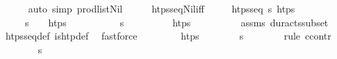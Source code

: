 \begin{isabellebody}
\ \ \ \ \isamarkupfalse%
\ {\isacharparenleft}{\kern0pt}auto\ simp{\isacharcolon}{\kern0pt}\ prod{\isacharunderscore}{\kern0pt}list{\isacharunderscore}{\kern0pt}Nil{\isacharparenright}{\kern0pt}%
\endisatagproof
{\isafoldproof}%
%
\isadelimproof
%
\endisadelimproof
\ \isanewline
\isanewline
\ \ \isamarkupfalse%
\ htps{\isacharunderscore}{\kern0pt}seq{\isacharunderscore}{\kern0pt}Nil{\isacharunderscore}{\kern0pt}iff{\isacharcolon}{\kern0pt}\isanewline
\ \ \ \ \ {\isachardoublequoteopen}htps{\isacharunderscore}{\kern0pt}seq\ {\isasympi}s\ htps{\isachardoublequoteclose}\isanewline
\ \ \ \ \ {\isachardoublequoteopen}{\isasympi}s\ {\isacharequal}{\kern0pt}\ {\isacharbrackleft}{\kern0pt}{\isacharbrackright}{\kern0pt}\ {\isasymlongleftrightarrow}\ htps\ {\isacharequal}{\kern0pt}\ {\isacharbrackleft}{\kern0pt}{\isacharbrackright}{\kern0pt}{\isachardoublequoteclose}\isanewline
%
\isadelimproof
\ \ %
\endisadelimproof
%
\isatagproof
{}\isamarkupfalse%
\isanewline
\ \ \ \ \isamarkupfalse%
\ {\isachardoublequoteopen}{\isasympi}s\ {\isacharequal}{\kern0pt}\ {\isacharbrackleft}{\kern0pt}{\isacharbrackright}{\kern0pt}{\isachardoublequoteclose}\isanewline
\ \ \ \ \isamarkupfalse%
\ \isamarkupfalse%
\ {\isachardoublequoteopen}htps\ {\isacharequal}{\kern0pt}\ {\isacharbrackleft}{\kern0pt}{\isacharbrackright}{\kern0pt}{\isachardoublequoteclose}\isanewline
\ \ \ \ \ \ \isamarkupfalse%
\ assms\ dur{\isacharunderscore}{\kern0pt}acts{\isacharunderscore}{\kern0pt}subset\ \isamarkupfalse%
\ htps{\isacharunderscore}{\kern0pt}seq{\isacharunderscore}{\kern0pt}def\ is{\isacharunderscore}{\kern0pt}htp{\isacharunderscore}{\kern0pt}def\ \isamarkupfalse%
\ fastforce\isanewline
\ \ \isamarkupfalse%
\isanewline
\ \ \ \ \isamarkupfalse%
\ {\isachardoublequoteopen}htps\ {\isacharequal}{\kern0pt}\ {\isacharbrackleft}{\kern0pt}{\isacharbrackright}{\kern0pt}{\isachardoublequoteclose}\isanewline
\ \ \ \ \isamarkupfalse%
\ {\isachardoublequoteopen}{\isasympi}s\ {\isacharequal}{\kern0pt}\ {\isacharbrackleft}{\kern0pt}{\isacharbrackright}{\kern0pt}{\isachardoublequoteclose}\isanewline
\ \ \ \ \isamarkupfalse%
\ {\isacharparenleft}{\kern0pt}rule\ ccontr{\isacharparenright}{\kern0pt}\isanewline
\ \ \ \ \ \ \isamarkupfalse%
\ {\isachardoublequoteopen}{\isasympi}s\ {\isasymnoteq}\ {\isacharbrackleft}{\kern0pt}{\isacharbrackright}{\kern0pt}{\isachardoublequoteclose}\isanewline

\end{isabellebody}
